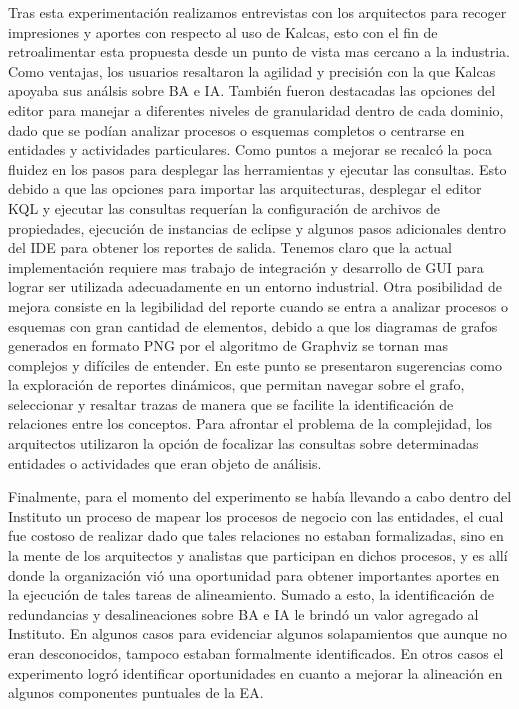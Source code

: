 Tras esta experimentaci\'on realizamos entrevistas con los arquitectos para recoger impresiones y aportes con respecto al uso de Kalcas, esto con el fin de retroalimentar esta propuesta desde un punto de vista mas cercano a la industria. Como ventajas, los usuarios resaltaron la agilidad y precisi\'on con la que Kalcas apoyaba sus an\'alsis sobre BA e IA. Tambi\'en fueron destacadas las opciones del editor para manejar a diferentes niveles de granularidad dentro de cada dominio, dado que se pod\'ian analizar procesos o esquemas completos o centrarse en entidades y actividades particulares. Como puntos a mejorar se recalc\'o la poca fluidez en los pasos para desplegar las herramientas y ejecutar las consultas. Esto debido a que las opciones para importar las arquitecturas, desplegar el editor KQL y ejecutar las consultas requer\'ian la configuraci\'on de archivos de propiedades, ejecuci\'on de instancias de eclipse y algunos pasos adicionales dentro del IDE para obtener los reportes de salida. Tenemos claro que la actual implementaci\'on requiere mas trabajo de integraci\'on y desarrollo de GUI para lograr ser utilizada adecuadamente en un entorno industrial. Otra posibilidad de mejora consiste en la legibilidad del reporte cuando se entra a analizar procesos o esquemas con gran cantidad de elementos, debido a que los diagramas de grafos generados en formato PNG por el algoritmo de Graphviz se tornan mas complejos y dif\'iciles de entender. En este punto se presentaron sugerencias como la exploraci\'on de reportes din\'amicos, que permitan navegar sobre el grafo, seleccionar y resaltar trazas de manera que se facilite la identificaci\'on de relaciones entre los conceptos. Para afrontar el problema de la complejidad, los arquitectos utilizaron la opci\'on de focalizar las consultas sobre determinadas entidades o actividades que eran objeto de an\'alisis. 

Finalmente, para el momento del experimento se hab\'ia llevando a cabo dentro del Instituto un proceso de mapear los procesos de negocio con las entidades, el cual fue costoso de realizar dado que tales relaciones no estaban formalizadas, sino en la mente de los arquitectos y analistas que participan en dichos procesos, y es all\'i donde la organizaci\'on vi\'o una oportunidad para obtener importantes aportes en la ejecuci\'on de tales tareas de alineamiento. Sumado a esto, la identificaci\'on de redundancias y desalineaciones sobre BA e IA le brind\'o un valor agregado al Instituto. En algunos casos para evidenciar algunos solapamientos que aunque no eran desconocidos, tampoco estaban formalmente identificados. En otros casos el experimento logr\'o identificar oportunidades en cuanto a mejorar la alineaci\'on en algunos componentes puntuales de la EA.